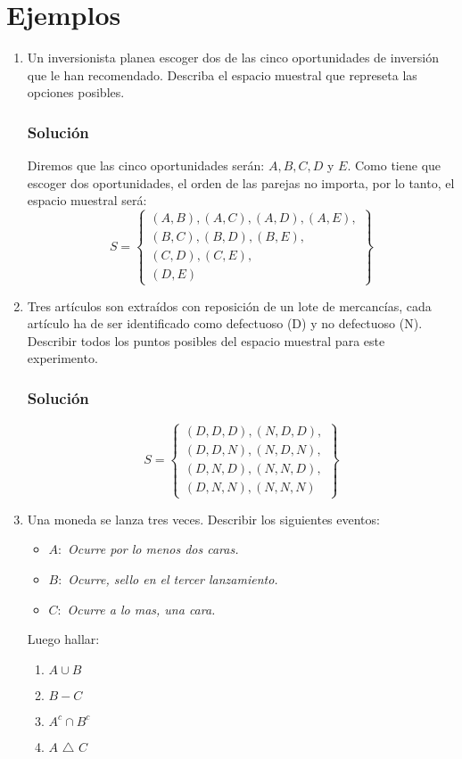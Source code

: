 \section{Ejemplos}
\begin{enumerate}
\item Un inversionista planea escoger dos de las cinco oportunidades de inversión que le han recomendado. Describa el espacio muestral que represeta las opciones posibles.
\subsubsection{Solución}
Diremos que las cinco oportunidades serán: $A,B,C,D$ y $E$. Como tiene que escoger dos oportunidades, el orden de las parejas no importa, por lo tanto, el espacio muestral será:
\begin{equation*}
S=
\left\lbrace 
\begin{aligned}
(A,B),(A,C),(A,D),(A,E), \\
(B,C),(B,D),(B,E), \\
(C,D),(C,E), \\
(D,E)
\end{aligned}
\right\rbrace 
\end{equation*}
\item Tres artículos son extraídos con reposición de un lote de mercancías, cada artículo ha de ser identificado como defectuoso (D) y no defectuoso (N). Describir todos los puntos posibles del espacio muestral para este experimento.
\subsubsection{Solución}
\begin{equation*}
S=
\left\lbrace 
\begin{aligned}
(D,D,D),(N,D,D),\\
(D,D,N),(N,D,N),\\
(D,N,D),(N,N,D),\\
(D,N,N),(N,N,N)
\end{aligned}
\right\rbrace 
\end{equation*}
\item Una moneda se lanza tres veces. Describir los siguientes eventos:
\begin{itemize}
\item $A:$ \textit{Ocurre por lo menos dos caras.}
\item $B:$ \textit{Ocurre, sello en el tercer lanzamiento.}
\item $C:$ \textit{Ocurre a lo mas, una cara.}
\end{itemize}
Luego hallar:
\begin{enumerate}
\item $A\cup B$
\item $B-C$
\item $A^c \cap B^c$
\item $A$ {\footnotesize $\triangle$} $C$
\end{enumerate}

\end{enumerate}
